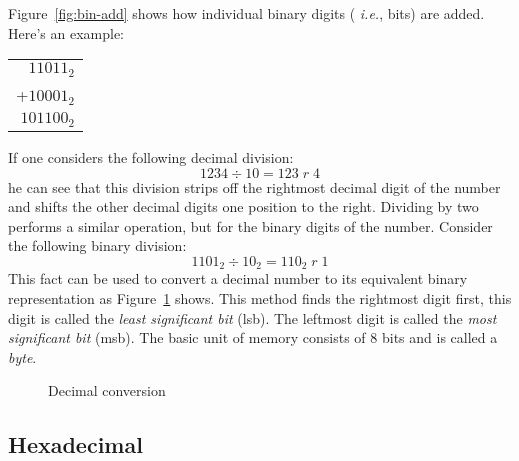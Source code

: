 Figure~\ref{fig:bin-add} shows how individual binary digits ({\em
i.e.}, bits) are added. Here's an example:

\begin{tabular}{r}
 $11011_2$ \\
+$10001_2$ \\
\hline
$101100_2$ \\
\end{tabular}

If one considers the following decimal division:
\[ 1234 \div 10 = 123\; r\; 4 \]
he can see that this division strips off the rightmost decimal digit of
the number and shifts the other decimal digits one position to the right.
Dividing by two performs a similar operation, but for the binary digits
of the number. Consider the following binary division:
\[ 1101_2 \div 10_2 = 110_2\; r\; 1 \]
This fact can be used to convert a decimal
number to its equivalent binary representation as
Figure~\ref{fig:dec-convert} shows. This method finds the rightmost
digit first, this digit is called the \emph{least significant bit} (lsb).
The leftmost digit is called the \emph{most significant bit} (msb).
The basic unit of memory consists of 8 bits and is called a \emph{byte}.

\begin{figure}[t]
\centering
{}
\caption{Decimal conversion \label{fig:dec-convert}}
\end{figure}

\subsection{Hexadecimal}

